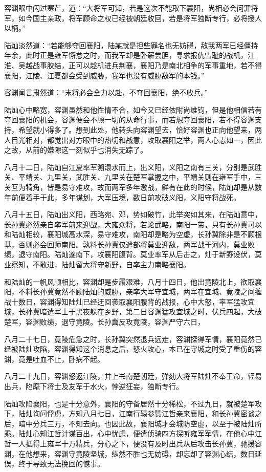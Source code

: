 容渊眼中闪过寒芒，道：“大将军可知，若是这次不能取下襄阳，尚相必会问罪将军，如今国主亲政，将军顾命之权已经被朝廷收回，若是将军独断专行，必将授人以柄。”

陆灿淡然道：“若能够夺回襄阳，陆某就是担些罪名也无妨碍，敌我两军已经僵持年余，此时正是雍军懈怠之时，而我军却是卧薪尝胆，寻求报仇雪耻的战机，江淮、吴越战事胶结，正可以趁机进兵荆襄，襄阳乃是南北相争的军事重地，若不得襄阳，江陵、江夏都会受到威胁，我军也没有威胁敌军的本钱。”

容渊闻言肃然道：“末将必会全力以赴，不夺回襄阳，绝不收兵。”

陆灿心中略宽，容渊虽然和他性情不合，如今又已经依附尚维钧，但是他相信若有夺回襄阳的机会，容渊便会不顾一切的从命行事，而若想夺回襄阳，若不得容渊支持，希望就小得多了。想到此处，他转头向容渊望去，恰好容渊也正向他望来，两人目光相对，都觉出对方眼中的热切和战意，攻取襄阳之举，两人心志如一，因此之故，从前的嫌隙这一刻似乎也消失无踪了。

八月十二日，陆灿自江夏率军溯澴水而上，出义阳，义阳之南有三关，分别是武胜关、平靖关、九里关，武胜关、九里关在楚军掌握之中，平靖关则在雍军手中，三关互为犄角，皆是易守难攻，故而两军多年激战，鲜有在此的时候，陆灿却是从数年前便着手于此，多年谋划，大军压境，数日前攻破义阳，义阳守将战死。

八月十五日，陆灿出义阳，西略宛、邓，势如破竹，此举突如其来，在陆灿意中，长孙冀必然亲自率军前来迎战，大雍众将，若论武略，南阳一带，只有长孙冀可以和陆灿相较，襄阳城高水深，易守难攻，南阳却是略为空虚，长孙冀除非是不顾根基，否则必会回师南阳。孰料长孙冀仅遣部将莫业迎敌，两军战于河内，莫业败绩，退守南阳。陆灿遂南下，攻襄阳腹背。莫业率军从后击之，灿于新野设伏，莫业察知，不敢进，陆灿留大将守新野，自率主力南略襄阳。

和陆灿的一帆风顺相比，容渊却是步履艰难，八月十四日，他出竟陵北上，欲取襄阳，不料长孙冀竟然不顾陆灿的威胁，亲率大军守宜城，两军在宜城、竟陵之间缠战十数日，容渊得知陆灿已经迂回袭取襄阳腹背的战报，心中大怒，率军猛攻宜城，长孙冀暗遣军士于黑夜躲在乡野，第二日容渊猛攻宜城之时，伏兵四起，大破楚军，容渊败绩，退守竟陵。长孙冀反攻竟陵，容渊严守六日，

八月二十七日，竟陵危急之时，长孙冀突然退兵远走，容渊探得军情，襄阳竟然已经被陆灿攻陷，容渊得知这个消息之后，怒火攻心，本已在守城之时受了重伤的容渊，竟是吐血不止，卧病不起。

八月二十九日，容渊怒返江陵，并上书南楚朝廷，弹劾大将军陆灿不奉王命，轻易出兵，陷麾下将士及友军于水火，悖逆狂妄，独断专行。

陆灿攻陷襄阳，也是十分意外，襄阳的守备居然十分稀松，不过九日，就被楚军攻下，陆灿询问俘虏，方知八月七日，江南行辕参赞江哲亲来襄阳，和长孙冀密谈之后，暗中分兵三万，不知去向。也因此故，襄阳城才会城防空虚，以至于被陆灿所乘。陆灿心知江哲计谋百出，心中忧虑，便遣侦骑四方探听雍军军情，在他心中江哲一人抵得上雍军十万精兵，分心之下，便没有及时出兵从后攻击长孙冀，驰援容渊，在他想来，容渊守竟陵坚城，纵然不胜也无妨碍，却忘却了容渊心结，数日延误，终于导致无法挽回的憾事。

